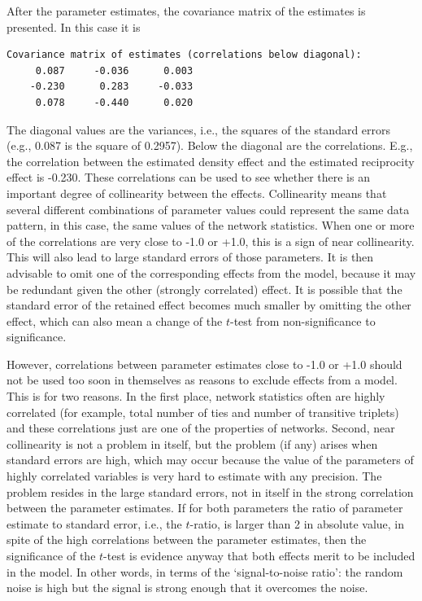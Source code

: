 \documentclass[a4paper,fleqn]{article}
\newcommand{\+}{\, + \,}
\begin{document}
{\begin{screen}
\newpage
\end{screen}
\smallskip

After the parameter estimates, the covariance matrix
of the estimates is presented. In this case it is

{\footnotesize
\begin{verbatim}
Covariance matrix of estimates (correlations below diagonal):
     0.087     -0.036      0.003
    -0.230      0.283     -0.033
     0.078     -0.440      0.020

\end{verbatim}
}

The diagonal values are the variances, i.e., the squares of the
standard errors (e.g., 0.087 is the square of 0.2957). Below the
diagonal are the correlations. E.g., the correlation between the
estimated density effect and the estimated reciprocity effect is
-0.230. These correlations can be used to see whether there is an
important degree of collinearity between the effects. Collinearity
means that several different combinations of parameter values
could represent the same data pattern, in
this case, the same values of the network statistics. When one or
more of the correlations are very close to -1.0 or +1.0, this is a
sign of near collinearity. This will also lead to large standard errors
of those parameters. It is then advisable to omit one of the
corresponding effects from the model, because it may be redundant
given the other (strongly correlated) effect. It is possible that
the standard error of the retained effect becomes much smaller by
omitting the other effect, which can also mean a change of the
$t$-test from non-significance to significance.

However, correlations between parameter estimates close to -1.0 or +1.0
should not be used too soon in themselves as reasons to exclude effects
from a model. This is for two reasons.
In the first place, network statistics often are highly correlated
(for example, total number of ties and number of transitive triplets)
and these correlations just are one of the properties of networks.
Second, near collinearity is not a problem in itself,
but the problem (if any) arises when standard errors are high,
which may occur
because the value of the parameters of highly correlated variables
is very hard to estimate with any precision. The problem resides in the
large standard errors, not in itself in the strong correlation between
the parameter estimates. If for both parameters
the ratio of parameter estimate to standard error,
i.e., the $t$-ratio, is larger than 2 in absolute value,
in spite of the high correlations between the parameter estimates, then
the significance of the $t$-test is evidence anyway that both
effects merit to be included in the model.
In other words, in terms of the `signal-to-noise ratio':
the random noise is high but the signal is strong enough
that it overcomes the noise.

}
\end{document}
